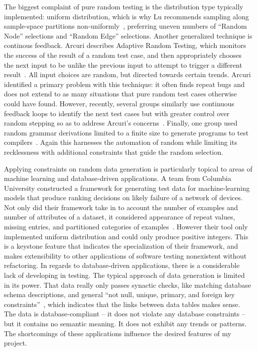 The biggest complaint of pure random testing is the distribution type typically implemented: uniform distribution, which is why Lu recommends sampling along sample-space partitions non-uniformly~\cite{Lu:2018:URS:3184558.3186240}, preferring uneven numbers of ``Random Node'' selections and ``Random Edge'' selections. Another generalized technique is continous feedback. Arcuri describes Adaptive Random Testing, which monitors the success of the result of a random test case, and then appropriately chooses the next input to be unlike the previous input to attempt to trigger a different result~\cite{Arcuri:2011:ART:2001420.2001452}. All input choices are random, but directed towards certain trends. Arcuri identified a primary problem with this technique: it often finds repeat bugs and does not extend to as many situations that pure random test cases otherwise could have found. However, recently, several groups similarly use continuous feedback loops to identify the next test cases but with greater control over random stepping so as to address Arcuri's concerns~\cite{Yatoh:2015:FRT:2771783.2771805,Hughes:2016:FMB:2896921.2896928,Sabor:2015:ART:2819261.2819271}. Finally, one group used random grammar derivations limited to a finite size to generate programs to test compilers~\cite{Palka:2011:TOC:1982595.1982615}. Again this harnesses the automation of random while limiting its recklessness with additional constraints that guide the random selection.

Applying constraints on random data generation is particularly topical to areas of machine learning and database-driven applications. A team from Columbia University constructed a framework for generating test data for machine-learning models that produce ranking decisions on likely failure of a network of devices. Not only did their framework take in to account the number of examples and number of attributes of a dataset, it considered appearance of repeat values, missing entries, and partitioned categories of examples~\cite{Murphy:2007:PRT:1292414.1292425,Murphy:Kaiser}. However their tool only implemented uniform distribution and could only produce positive integers. This is a keystone feature that indicates the specialization of their framework, and makes extensibility to other applications of software testing nonexistent without refactoring. In regards to database-driven applications, there is a considerable lack of developing in testing. The typical approach of data generation is limited in its power. That data really only passes synactic checks, like matching database schema descriptions, and general ``not null, unique, primary, and foreign key constraints''~\cite{Haller:2010:TDC:1838126.1838132}, which indicates that the links between data tables makes sense. The data is database-compliant -- it does not violate any database constraints -- but it contains no semantic meaning. It does not exhibit any trends or patterns. The shortcomings of these applications influence the desired features of my project.
